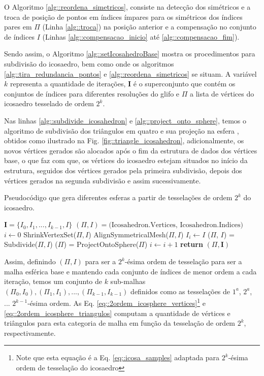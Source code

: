 \documentclass[
    12pt,                %
    oneside,            %
    a4paper,            %
    english,            %
    french,                %
    spanish,            %
    brazil                %
    ]{abntex2}
\begin{document}
O Algoritmo \ref{alg::reordena_simetricos}, consiste na detecção dos simétricos e a troca de posição de pontos em índices ímpares para os simétricos dos índices pares em $\Pi$ (Linha \ref{alg::troca}) na posição anterior e a compensação no conjunto de índices $I$ (Linhas \ref{alg::compensacao_inicio} até \ref{alg::compensacao_fim}).

Sendo assim, o Algoritmo \ref{alg::setIcosahedroBase} mostra os procedimentos para subdivisão do icosaedro, bem como onde os algoritmos \ref{alg::tira_redundancia_pontos} e \ref{alg::reordena_simetricos} se situam. A variável $k$ representa a quantidade de iterações, $\mathbf{I}$ é o superconjunto que contém os conjuntos de índices para diferentes resoluções do glifo e $\Pi$ a lista de vértices do icosaedro tesselado de ordem $2^k$.

Nas linhas \ref{alg::subdivide_icosahedron} e \ref{alg::project_onto_sphere}, temos o algoritmo de subdivisão dos triângulos em quatro e sua projeção na esfera \cite{luna2012}, obtidos como ilustrado na Fig. \ref{fig::triangle_icosahedron}, adicionalmente, os novos vértices gerados são alocados após o fim da estrutura de dados dos vértices base, o que faz com que, os vértices do icosaedro estejam situados no início da estrutura, seguidos dos vértices gerados pela primeira subdivisão, depois dos vértices gerados na segunda subdivisão e assim sucessivamente.

 \begin{algorithm}
 \caption{Pseudocódigo que gera diferentes esferas a partir de tesselações de ordem $2^k$ do icosaedro.}
 \label{alg::setIcosahedroBase}
 \begin{algorithmic}[1]
 \State $\mathbf{I} = \{I_0, I_1, ..., I_{k-1}, I\}$
 \State $(\Pi, I) = \text{(Icosahedron.Vertices, Icosahedron.Indices)}$  \cite{luna2012} \label{alg::init_icosahedron}
 \State $i \gets 0$
    \State ShrinkVertexSet($\Pi, I$)
    \State AlignSymmetricalMesh($\Pi, I$)
    \State $I_i \gets I$
    \State ($\Pi$, $I$) = Subdivide($\Pi, I$) \cite{luna2012}  \label{alg::subdivide_icosahedron}
    \State ($\Pi$) = ProjectOntoSphere($\Pi$) \cite{luna2012} \label{alg::project_onto_sphere}
    \State $i \gets i + 1$
\EndWhile
    \State \textbf{return} $(\Pi, \mathbf{I})$
 \EndFunction
 \end{algorithmic}
 \end{algorithm}
 

Assim, definindo $(\Pi, I)$ para ser a $2^{k}$-ésima ordem de tesselação para ser a malha esférica base e mantendo cada conjunto de índices de menor ordem a cada iteração, temos um conjunto de $k$ sub-malhas $(\Pi_0, I_0), (\Pi_1, I_1), ..., (\Pi_{k-1}, I_{k-1})$ definidos como as tesselações de $1^{a}$, $2^{a}$, ... $2^{k-1}$-ésima ordem. As Eq. \ref{eq::2ordem_icosphere_vertices}\footnote{Note que esta equação é a Eq. \ref{eq::icosa_samples} adaptada para $2^k$-ésima ordem de tesselação do icosaedro} e \ref{eq::2ordem_icosphere_triangulos} computam a quantidade de vértices e triângulos para esta categoria de malha em função da tesselação de ordem $2^k$, respectivamente.
\end{document}
